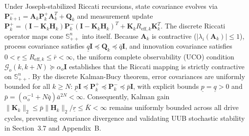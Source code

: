 \documentclass[balance,nocopyright,upint,varvw,hyphenate,barcolor=NavyBlue,nolists]{asmejour}
\begin{document}
Under Joseph-stabilized Riccati recursions, state covariance evolves via $\mathbf{P}_{k+1}^- = \mathbf{A}_k \mathbf{P}_k^+ \mathbf{A}_k^T + \mathbf{Q}_k$ and measurement update $\mathbf{P}_k^+ = (\mathbf{I} - \mathbf{K}_k \mathbf{H}_k)\mathbf{P}_k^-(\mathbf{I} - \mathbf{K}_k \mathbf{H}_k)^T + \mathbf{K}_k R_{\text{eff},k} \mathbf{K}_k^T$. The discrete Riccati operator maps cone $\mathbb{S}_{++}^n$ into itself. Because $\mathbf{A}_k$ is contractive ($|\lambda_i(\mathbf{A}_k)| \le 1$), process covariance satisfies $\underline{q}\mathbf{I} \preceq \mathbf{Q}_k \preceq \bar{q}\mathbf{I}$, and innovation covariance satisfies $0 < \underline{r} \le R_{\text{eff},k} \le \bar{r} < \infty$, the uniform complete observability (UCO) condition $\mathcal{G}_o(k, k+N) \succeq \alpha_o \mathbf{I}$ establishes that the Riccati mapping is strictly contractive on $\mathbb{S}_{++}^n$. By the discrete Kalman-Bucy theorem, error covariances are uniformly bounded for all $k \ge N$: $\underline{p} \mathbf{I} \preceq \mathbf{P}_k^+ \preceq \mathbf{P}_k^- \preceq \bar{p} \mathbf{I}$, with explicit bounds $\underline{p} = \underline{q} > 0$ and $\bar{p} = (\alpha_o^{-1} + N \bar{q})\bar{a}^{2N} < \infty$. Consequently, Kalman gain $\|\mathbf{K}_k\|_2 \le \bar{p} \|\mathbf{H}_k\|_2 / \underline{r} \le \bar{K} < \infty$ remains uniformly bounded across all drive cycles, preventing covariance divergence and validating UUB stochastic stability in Section~3.7 and Appendix~B.

\setlength{\bibsep}{0.0pt}


\end{document}

